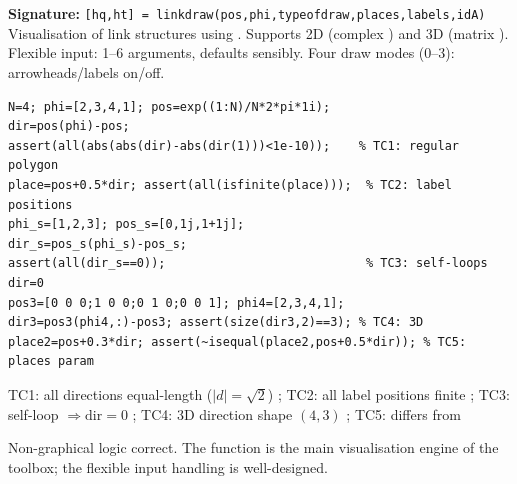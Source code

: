 \chapter{}
\begin{tcolorbox}[Abox,title={Analysis}]
\textbf{Signature:} \lstinline|[hq,ht] = linkdraw(pos,phi,typeofdraw,places,labels,idA)|\quad
Visualisation of link structures using . Supports 2D (complex ) and 3D (matrix ). Flexible input: 1--6 arguments, defaults sensibly. Four draw modes (0--3): arrowheads/labels on/off.
\end{tcolorbox}
\begin{lstlisting}[caption={Tests for linkdraw.m -- non-graphical logic}]
N=4; phi=[2,3,4,1]; pos=exp((1:N)/N*2*pi*1i);
dir=pos(phi)-pos;
assert(all(abs(abs(dir)-abs(dir(1)))<1e-10));    % TC1: regular polygon
place=pos+0.5*dir; assert(all(isfinite(place)));  % TC2: label positions
phi_s=[1,2,3]; pos_s=[0,1j,1+1j];
dir_s=pos_s(phi_s)-pos_s;
assert(all(dir_s==0));                            % TC3: self-loops dir=0
pos3=[0 0 0;1 0 0;0 1 0;0 0 1]; phi4=[2,3,4,1];
dir3=pos3(phi4,:)-pos3; assert(size(dir3,2)==3); % TC4: 3D
place2=pos+0.3*dir; assert(~isequal(place2,pos+0.5*dir)); % TC5: places param
\end{lstlisting}
\begin{tcolorbox}[Pbox,title={TC1--TC5 -- All pass}]
TC1: all directions equal-length ($|d|=\sqrt{2}$) \APROVADO; TC2: all label positions finite \APROVADO; TC3: self-loop $\Rightarrow\mathrm{dir}=0$ \APROVADO; TC4: 3D direction shape $(4,3)$ \APROVADO; TC5:  differs from  \APROVADO
\end{tcolorbox}
\begin{concl}
Non-graphical logic correct. The function is the main visualisation engine of the toolbox; the flexible input handling is well-designed.
\end{concl}

